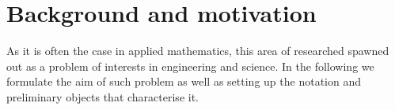\documentclass[../main.tex]{subfiles}
\begin{document}
\section{Background and motivation}\label{sec:background}

As it is often the case in applied mathematics, this area of researched spawned out as a problem of interests in engineering and science. 
In the following we formulate the aim of such problem as well as setting up the notation and preliminary objects that characterise it. 



\end{document}
